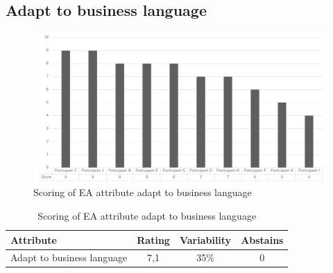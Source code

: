 \subsection{Adapt to business language}
\begin{figure}[h!]
	\centering
	\includegraphics[width=0.9\linewidth]{images/scoreeaadapttobusinesslanguage}
	\caption[Scoring of EA attribute adapt to business language]{Scoring of EA attribute adapt to business language}
	\label{fig:appscoringeaadapttobusinesslanguage}
\end{figure}
\begin{table}[h!]
	\centering
	\begin{tabular}{p{}ccc}
		\toprule
		\textbf{Attribute} & \textbf{Rating} & \textbf{Variability} & \textbf{Abstains} \\
		\midrule
		Adapt to business language & 7,1 & 35\% & 0 \\%
		\bottomrule
	\end{tabular}%
	\caption[Scoring of EA attribute adapt to business language]{Scoring of EA attribute adapt to business language}
	\label{tab:appscoringeaadapttobusinesslanguage}%
\end{table}%
\newpage
